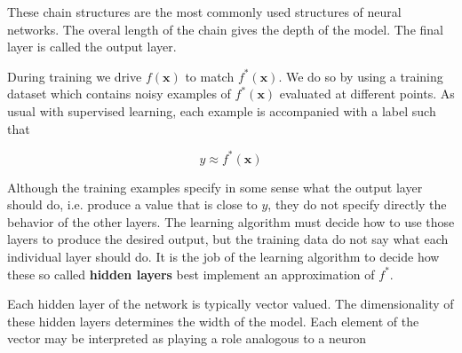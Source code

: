 These chain structures are the most commonly used structures of neural networks. The overal length of the chain gives
the depth of the model. The final layer is called the output layer. 

During training we drive $f(\mathbf{x})$ to match $f^{*}(\mathbf{x})$. We do so by using a training dataset which contains noisy examples of 
$f^{*}(\mathbf{x})$ evaluated at different points. As usual with supervised learning, each example is accompanied with a label such that

\begin{equation}
y \approx f^{*}(\mathbf{x}) 
\end{equation}

Although the training examples specify in some sense what the output layer should do, i.e. produce a value that is close to $y$, they do not
specify directly the behavior of the other layers. The learning algorithm must decide
how to use those layers to produce the desired output, but the training data do
not say what each individual layer should do. It is the job of the learning algorithm to decide how these so called \textbf{hidden layers} best implement
an approximation of $f^{*}$. 

Each hidden layer of the network is typically vector valued. The
dimensionality of these hidden layers determines the
width of the model. Each element of the vector may be interpreted as playing a role analogous to a neuron

